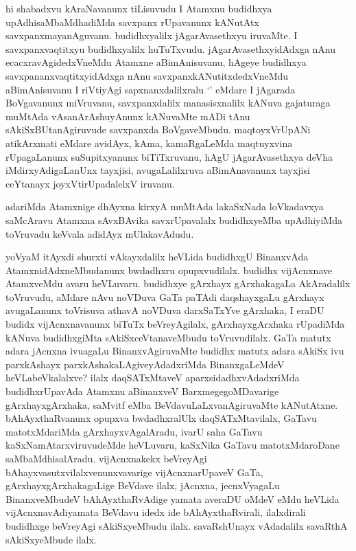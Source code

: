 \begin{artha}
hi shabadxvu kAraNavanunx tiLisuvudu I Atamxnu budidhxya upAdhisaMbaMdhadiMda savxpanx rUpavanunx kANutAtx savxpanxmayanAguvanu. budidhxyalilx jAgarAvasethxyu iruvaMte. I savxpanxvaqtitxyu budidhxyalilx huTuTxvudu. jAgarAvasethxyidAdxga nAnu ecacxravAgidedxVneMdu Atamxne aBimAnisuvanu, hAgeye budidhxya savxpananxvaqtitxyidAdxga nAnu savxpanxkANutitxdedxVneMdu aBimAnisuvanu I riVtiyAgi sapxnanxdalilxralu `\stext ' eMdare I jAgarada BoVgavanunx miVruvanu, savxpanxdalilx manasisxnalilx kANuva gajaturaga muMtAda vAsanArAshuyAnunx kANuvaMte mADi tAnu sAkiSxBUtanAgiruvude savxpanxda BoVgaveMbudu. maqtoyxVrUpANi atikArxmati eMdare avidAyx, kAma, kamaRgaLeMda maqtuyxvina rUpagaLanunx suSupitxyanunx biTiTxruvanu, hAgU jAgarAvasethxya deVha iMdirxyAdigaLanUnx tayxjisi, avugaLalilxruva aBimAnavanunx tayxjisi ceYtanayx joyxVtirUpadalelxV iruvanu.
\end{artha}

\begin{artha}%
adariMda Atamxnige dhAyxna kirxyA muMtAda lakaSxNada loVkadavxya saMcAravu Atamxna sAvxBAvika savxrUpavalalx budidhxyeMba upAdhiyiMda toVruvadu keVvala adidAyx mUlakavAdudu. 
\end{artha}


\begin{artha}
yoV\s yaM itAyxdi shurxti vAkayxdalilx heVLida budidhxgU BinanxvAda AtamxnidAdxneMbudanunx bwdadhxru opupxvudilalx. budidhx vijAcnxnave AtamxveMdu avaru heVLuvaru. budidhxye gArxhayx gArxhakagaLa AkAradalilx toVruvudu, aMdare nAvu noVDuva GaTa paTAdi daqshayxgaLu gArxhayx avugaLanunx toVrisuva athavA noVDuva darxSaTxYve gArxhaka, I eraDU budidx vijAcnxnavanunx biTuTx beVreyAgilalx, gArxhayxgArxhaka rUpadiMda kANuva budidhxgiMta sAkiSxceVtanaveMbudu toVruvudilalx. GaTa matutx adara jAcnxna ivuagaLu BinanxvAgiruvaMte budidhx matutx adara sAkiSx ivu parxkAshayx parxkAshakaLAgiveyAdadxriMda BinanxgaLeMdeV heVLabeVkalalxve? ilalx daqSATxMtaveV aparxsidadhxvAdadxriMda budidhxrUpavAda Atamxnu aBinanxveV BarxmegegoMDavarige gArxhayxgArxhaka, saMvitf eMba BeVdavuLaLxvanAgiruvaMte kANutAtxne. bAhAyxthaRvanunx opupxva bwdadhxralUlx daqSATxMtavilalx, GaTavu matotxMdariMda gArxhayxvAgalAradu, ivarU saha GaTavu kaSxNamAtarxviruvudeMde heVLuvaru, kaSxNika GaTavu matotxMdaroDane saMbaMdhisalAradu. vijAcnxnakekx beVreyAgi bAhayxvasutxvilalxvenunxvavarige vijAcnxnarUpaveV GaTa, gArxhayxgArxhakagaLige BeVdave ilalx, jAcnxna, jecnxVyagaLu BinanxveMbudeV bAhAyxthaRvAdige yamata averaDU oMdeV eMdu heVLida vijAcnxnavAdiyamata BeVdavu idedx ide bAhAyxthaRvirali, ilalxdirali budidhxge beVreyAgi sAkiSxyeMbudu ilalx. savaRshUnayx vAdadalilx savaRthA sAkiSxyeMbude ilalx. 
\end{artha}

